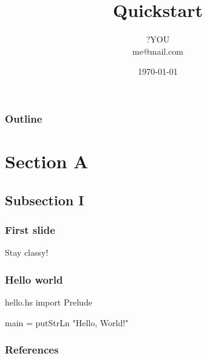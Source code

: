 \documentclass{beamer}
\title{Quickstart}
\author[?YOU]{?YOU \\ me@mail.com}
\date{\today}
\begin{document}
\begin{frame}
\titlepage
\end{frame}

\contentpagetrue
\begin{frame}
\frametitle{Outline}
\tableofcontents
\end{frame}

\section{Section A}
\subsection{Subsection I}
\contentpagefalse
\frame{\sectionpage}

\contentpagetrue
\begin{frame}
  \frametitle{First slide}
  Stay classy!
\end{frame}

\begin{frame}[fragile]
  \frametitle{Hello world}
  \begin{Code}[Haskell]{hello.hs}
import Prelude

main = putStrLn "Hello, World!"
  \end{Code}
\end{frame}

\nocite{*}
\begin{frame}[allowframebreaks]
  \frametitle{References}
  \printbibliography
\end{frame}
\end{document}
